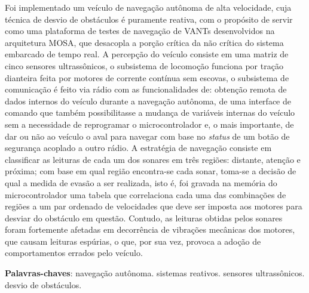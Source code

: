 
\setlength{\absparsep}{18pt} %
\begin{resumo}
Foi implementado um veículo de navegação autônoma de alta velocidade, cuja técnica de desvio de obstáculos é puramente reativa, com o propósito de 
servir como uma plataforma de testes de navegação de VANTs desenvolvidos na arquitetura MOSA, que desacopla a porção crítica da não crítica do 
sistema embarcado de tempo real.
A percepção do veículo consiste em uma matriz de cinco sensores ultrassônicos, o subsistema de locomoção funciona por tração dianteira feita por 
motores de corrente contínua sem escovas, o subsistema de comunicação é feito via rádio com as funcionalidades de: obtenção remota de dados 
internos do veículo durante a navegação autônoma, de uma interface de comando que também possibilitasse a mudança de variáveis internas do veículo sem 
a necessidade de reprogramar o microcontrolador e, o mais importante, de dar ou não ao veículo o aval para navegar com base no \textit{status} de um 
botão de segurança acoplado a outro rádio.
A estratégia de navegação consiste em classificar as leituras de cada um dos sonares em três regiões: distante, atenção e próxima; com base em qual 
região encontra-se cada sonar, toma-se a decisão de qual a medida de evasão a ser realizada, isto é, foi gravada na memória do microcontrolador uma 
tabela que correlaciona cada uma das combinações de regiões a um par ordenado de velocidades que deve ser imposta aos motores para desviar do 
obstáculo em questão.
Contudo, as leituras obtidas pelos sonares foram fortemente afetadas em decorrência de vibrações mecânicas dos motores, que causam leituras 
espúrias, o que, por sua vez, provoca a adoção de comportamentos errados pelo veículo.

 \textbf{Palavras-chaves}: navegação autônoma. sistemas reativos. sensores ultrassônicos. desvio de obstáculos.
\end{resumo}

